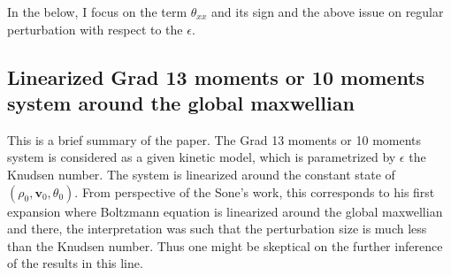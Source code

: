 \documentclass[a4paper,12pt]{article}
\begin{document}
In the below, I focus on the term $\theta_{xx}$ and its sign and the above issue on regular perturbation with respect to the $\epsilon$.


\subsection{Linearized Grad 13 moments or 10 moments system around the global maxwellian}
This is a brief summary of the paper. The Grad 13 moments or 10 moments system is considered as a given kinetic model, which is parametrized by $\epsilon$ the Knudsen number. The system is linearized around the constant state of $(\rho_0,\mathbf{v}_0,\theta_0)$. From perspective of the Sone's work, this corresponds to his first expansion where Boltzmann equation is linearized around the global maxwellian and there, the interpretation was such that the perturbation size is much less than the Knudsen number. Thus one might be skeptical on the further inference of the results in this line.
\end{document}
